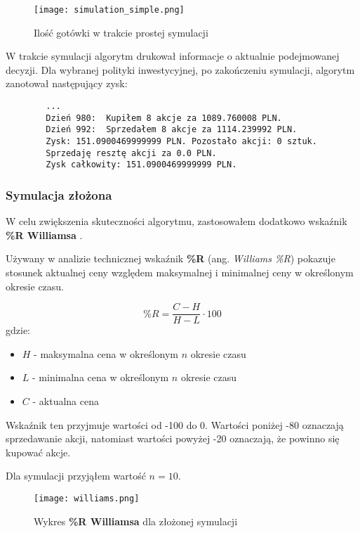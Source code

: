 \documentclass{article}
\begin{document}
    \begin{figure}[H]
        \texttt{[image: simulation\_simple.png]}
        \centering
        \caption{Ilość gotówki w trakcie prostej symulacji}
    \end{figure}

    W trakcie symulacji algorytm drukował informacje o aktualnie podejmowanej decyzji.
    Dla wybranej polityki inwestycyjnej, po zakończeniu symulacji, algorytm zanotował następujący zysk:
    \begin{verbatim}
        ...
        Dzień 980:  Kupiłem 8 akcje za 1089.760008 PLN.
        Dzień 992:  Sprzedałem 8 akcje za 1114.239992 PLN.
        Zysk: 151.0900469999999 PLN. Pozostało akcji: 0 sztuk.
        Sprzedaję resztę akcji za 0.0 PLN.
        Zysk całkowity: 151.0900469999999 PLN.
    \end{verbatim}

    \subsubsection{Symulacja złożona}

    W celu zwiększenia skuteczności algorytmu, zastosowałem dodatkowo wskaźnik \textbf{\%R Williamsa} \cite{wiki1}\cite{williams}.

    Używany w analizie technicznej wskaźnik \textbf{\%R} (ang. \textit{Williams \%R})
    pokazuje stosunek aktualnej ceny względem maksymalnej i minimalnej ceny w określonym okresie czasu.

    \begin{equation}
        \%R = \frac{C - H}{H - L} \cdot 100
    \end{equation}
    gdzie:
    \begin{itemize}
        \item $H$ - maksymalna cena w określonym $n$ okresie czasu
        \item $L$ - minimalna cena w określonym $n$ okresie czasu
        \item $C$ - aktualna cena
    \end{itemize}

    Wskaźnik ten przyjmuje wartości od -100 do 0.
    Wartości poniżej -80 oznaczają sprzedawanie akcji,
    natomiast wartości powyżej -20 oznaczają, że powinno się kupować akcje.

    Dla symulacji przyjąłem wartość $n = 10$.

    \begin{figure}[H]
        \texttt{[image: williams.png]}
        \centering
        \caption{Wykres \textbf{\%R Williamsa} dla złożonej symulacji}
    \end{figure}
\end{document}
